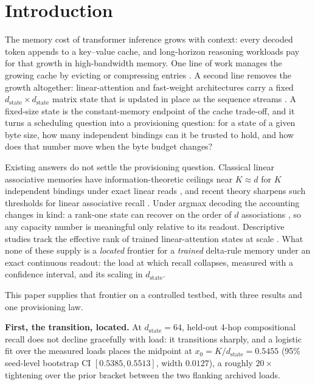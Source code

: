\section{Introduction}
\label{sec:intro}

The memory cost of transformer inference grows with context: every decoded
token appends to a key--value cache, and long-horizon reasoning workloads
pay for that growth in high-bandwidth memory. One line of work manages the
growing cache by evicting or compressing entries
\citep{xiao2024streamingllm, zhang2023h2o}. A second line removes the
growth altogether: linear-attention and fast-weight architectures carry a
fixed $d_{\mathrm{state}} \times d_{\mathrm{state}}$ matrix state that is
updated in place as the sequence streams
\citep{katharopoulos2020linear, schlag2021linear, yang2024deltanet,
gu2023mamba}. A fixed-size state is the constant-memory endpoint of the
cache trade-off, and it turns a scheduling question into a provisioning
question: for a state of a given byte size, how many independent bindings
can it be trusted to hold, and how does that number move when the byte
budget changes?

Existing answers do not settle the provisioning question. Classical linear
associative memories have information-theoretic ceilings near
$K \approx d$ for $K$ independent bindings under exact linear reads
\citep{kohonen1972correlation, anderson1972simple}, and recent theory
sharpens such thresholds for linear associative recall
\citep{barnfield2026sharp}. Under argmax decoding the accounting changes
in kind: a rank-one state can recover on the order of $d$ associations
\citep{nichani2025factual}, so any capacity number is meaningful only
relative to its readout. Descriptive studies track the effective rank of
trained linear-attention states at scale
\citep{nazari2026rank, sun2026staterank}. What none of these supply is a
\emph{located} frontier for a \emph{trained} delta-rule memory under an
exact continuous readout: the load at which recall collapses, measured
with a confidence interval, and its scaling in $d_{\mathrm{state}}$.

This paper supplies that frontier on a controlled testbed, with three
results and one provisioning law.

\textbf{First, the transition, located.} At $d_{\mathrm{state}}=64$,
held-out 4-hop compositional recall does not decline gracefully with
load: it transitions sharply, and a logistic fit over the measured loads places the
midpoint at $x_0 = K/d_{\mathrm{state}} = 0.5455$ (95\% seed-level
bootstrap CI $[0.5385, 0.5513]$, width $0.0127$), %
a roughly $20\times$ tightening over the prior bracket between the two
flanking archived loads. %

